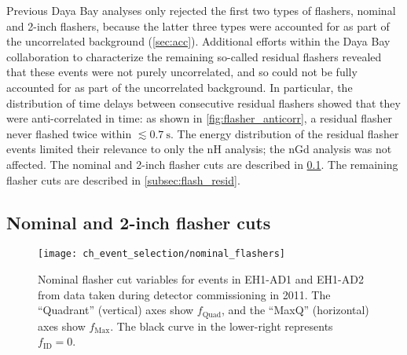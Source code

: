 Previous Daya Bay analyses only rejected the first two types of flashers,
nominal and 2-inch flashers,
because the latter three types were accounted for
as part of the uncorrelated background (\cref{sec:acc}).
Additional efforts within the Daya Bay collaboration
to characterize the remaining so-called residual flashers
revealed that these events were not purely uncorrelated,
and so could not be fully accounted for as part of the uncorrelated background.
In particular, the distribution of time delays
between consecutive residual flashers
showed that they were anti-correlated in time:
as shown in \cref{fig:flasher_anticorr},
a residual flasher never flashed twice within $\lesssim \SI{0.7}{\s}$.
The energy distribution of the residual flasher events
limited their relevance to only the nH analysis; the nGd analysis was not affected.
The nominal and 2-inch flasher cuts are described in \cref{subsec:flash_nominal}.
The remaining flasher cuts are described in \cref{subsec:flash_resid}.

\subsection{Nominal and 2-inch flasher cuts}
\label{subsec:flash_nominal}

\begin{figure}
    \centering
    \texttt{[image: ch\_event\_selection/nominal\_flashers]}
    \caption[Nominal flasher cut variables]{
        Nominal flasher cut variables for events in EH1-AD1 and EH1-AD2
        from data taken during detector commissioning in 2011.
        The ``Quadrant'' (vertical) axes show $f_\text{Quad}$,
        and the ``MaxQ'' (horizontal) axes show $f_\text{Max}$.
        The black curve in the lower-right represents $f_\text{ID} = 0$.
    }
    \label{fig:flasher_nominal_cut}
\end{figure}

